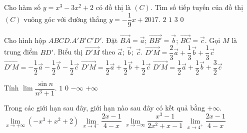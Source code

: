\begin{ex}%
	Cho hàm số $y=x^3-3x^2+2$ có đồ thị là $(C)$. Tìm số tiếp tuyến của đồ thị $(C)$ vuông góc với đường thẳng $y=-\dfrac{1}{9}x+2017$.
	\choice
	{\True $2$}
	{$1$}
	{$3$}
	{$0$}
\end{ex}

\begin{ex}%
	Cho hình hộp $ABCD.A'B'C'D'$. Đặt $\vec{BA}=\vec{a}$; $\vec{BB'}=\vec{b}$; $\vec{BC}=\vec{c}$. Gọi $M$ là trung điểm $BD'$. Biểu thị $\vec{D'M}$ theo $\vec{a}$; $\vec{b}$; $\vec{c}$.
	\choice
	{$\vec{D'M}=\dfrac{2}{3}\vec{a}+\dfrac{1}{3}\vec{b}+\dfrac{1}{3}\vec{c}$}
	{\True $\vec{D'M}=-\dfrac{1}{2}\vec{a}-\dfrac{1}{2}\vec{b}-\dfrac{1}{2}\vec{c}$}
	{$\vec{D'M}=\dfrac{1}{2}\vec{a}+\dfrac{1}{2}\vec{b}+\dfrac{1}{2}\vec{c}$}
	{$\vec{D'M}=\dfrac{1}{2}\vec{a}+\dfrac{1}{2}\vec{b}+\dfrac{3}{2}\vec{c}$}
\end{ex}

\begin{ex}%
	Tính $\lim \dfrac{\sin n}{n^3+1}$.
	\choice
	{$1$}
	{\True $0$}
	{$-\infty$}
	{$+\infty$}
\end{ex}

\begin{ex}%
	Trong các giới hạn sau đây, giới hạn nào sau đây có kết quả bằng $+\infty$.
	\choice
	{$\lim\limits_{x\to +\infty}\left(-x^3+x^2+2\right)$}
	{\True $\lim\limits_{x\to 4^-}\dfrac{2x-1}{4-x}$}
	{$\lim\limits_{x\to -\infty}\dfrac{x^3-1}{2x^2+x-1}$}
	{$\lim\limits_{x\to 4^+}\dfrac{2x-1}{4-x} $}
\end{ex}

